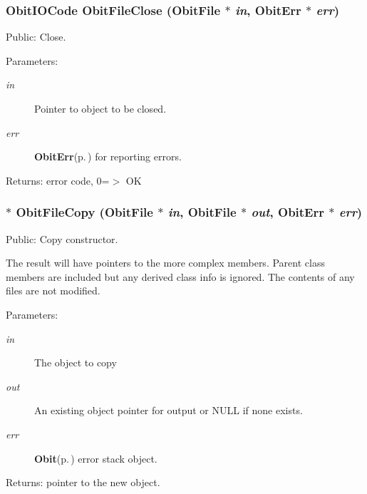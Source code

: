 \subsubsection{\setlength{\rightskip}{0pt plus 5cm}Obit\-IOCode Obit\-File\-Close ({\bf Obit\-File} $\ast$ {\em in}, {\bf Obit\-Err} $\ast$ {\em err})}\label{ObitFile_8h_a30}


Public: Close. 

\begin{Desc}
\item[Parameters:]
\begin{description}
\item[{\em in}]Pointer to object to be closed. \item[{\em err}]{\bf Obit\-Err}{\rm (p.\,\pageref{structObitErr})} for reporting errors. \end{description}
\end{Desc}
\begin{Desc}
\item[Returns:]error code, 0=$>$ OK \end{Desc}
\subsubsection{$\ast$ Obit\-File\-Copy ({\bf Obit\-File} $\ast$ {\em in}, {\bf Obit\-File} $\ast$ {\em out}, {\bf Obit\-Err} $\ast$ {\em err})}\label{ObitFile_8h_a28}


Public: Copy constructor. 

The result will have pointers to the more complex members. Parent class members are included but any derived class info is ignored. The contents of any files are not modified. \begin{Desc}
\item[Parameters:]
\begin{description}
\item[{\em in}]The object to copy \item[{\em out}]An existing object pointer for output or NULL if none exists. \item[{\em err}]{\bf Obit}{\rm (p.\,\pageref{structObit})} error stack object. \end{description}
\end{Desc}
\begin{Desc}
\item[Returns:]pointer to the new object. \end{Desc}
